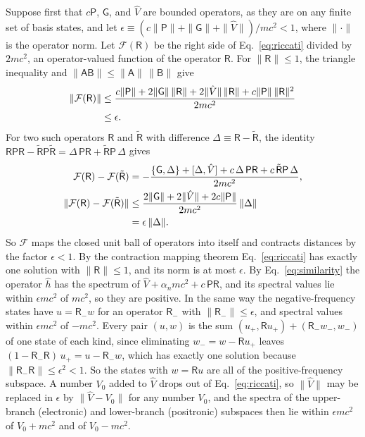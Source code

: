 \documentclass[aps,prd,onecolumn,tightenlines,nofootinbib,notitlepage,11pt,floatfix]{revtex4-2}
\theoremstyle{indentedtheorem}
\begin{document}
Suppose first that $c\mathsf{P}$, $\mathsf{G}$, and $\hat{V}$ are bounded operators, as they are on any finite set of basis states, and let $\epsilon\equiv(c\|\mathsf{P}\|+\|\mathsf{G}\|+\|\hat{V}\|)/mc^2<1$, where $\|\cdot\|$ is the operator norm. Let $\mathcal{F}(\mathsf{R})$ be the right side of Eq.~\eqref{eq:riccati} divided by $2mc^2$, an operator-valued function of the operator $\mathsf{R}$. For $\|\mathsf{R}\|\le1$, the triangle inequality and $\|\mathsf{A}\mathsf{B}\|\le\|\mathsf{A}\|\,\|\mathsf{B}\|$ give
\begin{align}
    \|\mathcal{F}(\mathsf{R})\| &\le \frac{c\|\mathsf{P}\| + 2\|\mathsf{G}\|\,\|\mathsf{R}\| + 2\|\hat{V}\|\,\|\mathsf{R}\| + c\|\mathsf{P}\|\,\|\mathsf{R}\|^2}{2mc^2} \notag\\
    &\le \epsilon .
    \label{eq:contraction_image}
\end{align}
For two such operators $\mathsf{R}$ and $\tilde{\mathsf{R}}$ with difference $\Delta\equiv\mathsf{R}-\tilde{\mathsf{R}}$, the identity $\mathsf{R}\mathsf{P}\mathsf{R}-\tilde{\mathsf{R}}\mathsf{P}\tilde{\mathsf{R}}=\Delta\,\mathsf{P}\mathsf{R}+\tilde{\mathsf{R}}\mathsf{P}\,\Delta$ gives
\begin{align}
    \mathcal{F}(\mathsf{R})-\mathcal{F}(\tilde{\mathsf{R}}) &= -\frac{\{\mathsf{G},\Delta\} + [\Delta,\hat{V}] + c\,\Delta\,\mathsf{P}\mathsf{R} + c\,\tilde{\mathsf{R}}\mathsf{P}\,\Delta}{2mc^2} , \notag\\
    \|\mathcal{F}(\mathsf{R})-\mathcal{F}(\tilde{\mathsf{R}})\| &\le \frac{2\|\mathsf{G}\| + 2\|\hat{V}\| + 2c\|\mathsf{P}\|}{2mc^2}\,\|\Delta\| \notag\\
    &= \epsilon\,\|\Delta\| .
    \label{eq:contraction_lipschitz}
\end{align}
So $\mathcal{F}$ maps the closed unit ball of operators into itself and contracts distances by the factor $\epsilon<1$. By the contraction mapping theorem Eq.~\eqref{eq:riccati} has exactly one solution with $\|\mathsf{R}\|\le1$, and its norm is at most $\epsilon$. By Eq.~\eqref{eq:similarity} the operator $\hat{h}$ has the spectrum of $\hat{V}+\alpha_nmc^2+c\,\mathsf{P}\mathsf{R}$, and its spectral values lie within $\epsilon mc^2$ of $mc^2$, so they are positive. In the same way the negative-frequency states have $u=\mathsf{R}_-w$ for an operator $\mathsf{R}_-$ with $\|\mathsf{R}_-\|\le\epsilon$, and spectral values within $\epsilon mc^2$ of $-mc^2$. Every pair $(u,w)$ is the sum $(u_+,\mathsf{R}u_+)+(\mathsf{R}_-w_-,w_-)$ of one state of each kind, since eliminating $w_-=w-\mathsf{R}u_+$ leaves $(1-\mathsf{R}_-\mathsf{R})\,u_+=u-\mathsf{R}_-w$, which has exactly one solution because $\|\mathsf{R}_-\mathsf{R}\|\le\epsilon^2<1$. So the states with $w=\mathsf{R}u$ are all of the positive-frequency subspace. A number $V_0$ added to $\hat{V}$ drops out of Eq.~\eqref{eq:riccati}, so $\|\hat{V}\|$ may be replaced in $\epsilon$ by $\|\hat{V}-V_0\|$ for any number $V_0$, and the spectra of the upper-branch (electronic) and lower-branch (positronic) subspaces then lie within $\epsilon mc^2$ of $V_0+mc^2$ and of $V_0-mc^2$.
\end{document}
